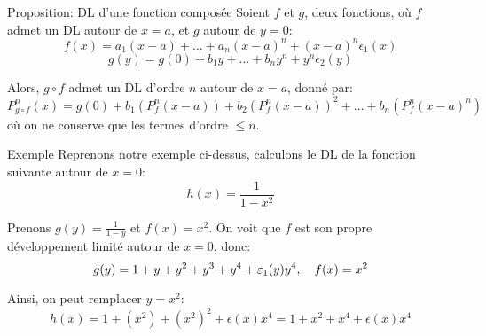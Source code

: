 \documentclass[a4paper]{article}
\begin{document}
\begin{parag}{Proposition: DL d'une fonction composée}
    Soient $f$ et $g$, deux fonctions, où $f$ admet un DL autour de $x = a$, et $g$ autour de $y = 0$:
    \[f\left(x\right) = a_1\left(x - a\right) + \ldots + a_n\left(x - a\right)^n + \left(x - a\right)^n \epsilon_1\left(x\right)\]
    \[g\left(y\right) = g\left(0\right) + b_1 y + \ldots + b_n y^n + y^n \epsilon_2\left(y\right)\]

    Alors, $g \circ f$ admet un DL d'ordre $n$ autour de $x = a$, donné par:
    \[P_{g \circ f}^n\left(x\right) = g\left(0\right) + b_1\left(P_f^n\left(x - a\right)\right) + b_2\left(P_f^n\left(x - a\right)\right)^2 + \ldots + b_n\left(P_f^n\left(x - a\right)^n\right)\]
    où on ne conserve que les termes d'ordre $\leq n$.
\end{parag}

\begin{parag}{Exemple}
    Reprenons notre exemple ci-dessus, calculons le DL de la fonction suivante autour de $x = 0$:
    \[h\left(x\right) = \frac{1}{1 - x^2}\]

    Prenons $g\left(y\right) = \frac{1}{1 - y}$ et $f\left(x\right) = x^2$. On voit que $f$ est son propre développement limité autour de $x = 0$, donc:
    \[g\left(y\right) = 1 + y + y^2 + y^3 + y^4 + \epsilon_1\left(y\right) y^4, \mathspace f\left(x\right) = x^2\]

    Ainsi, on peut remplacer $y = x^2$:
    \[h\left(x\right) = 1 + \left(x^2\right) + \left(x^2\right)^2 + \epsilon\left(x\right)x^4 = 1 + x^2 + x^4 + \epsilon\left(x\right) x^4\]
\end{parag}
\end{document}
